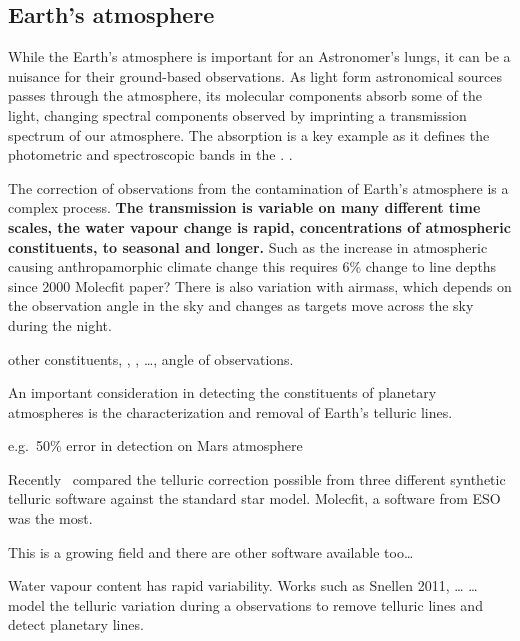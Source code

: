 \subsection{Earth's atmosphere}
While the Earth's atmosphere is important for an Astronomer's lungs, it can be a nuisance for their ground-based observations.
As light form astronomical sources passes through the atmosphere, its molecular components absorb some of the light, changing spectral components observed by imprinting a transmission spectrum of our atmosphere.
The  absorption is a key example as it defines the photometric and spectroscopic bands in the \nir{}. .

The correction of observations from the contamination of Earth's atmosphere is a complex process.\textbf{
The transmission is variable on many different time scales, the water vapour change is rapid, concentrations of atmospheric constituents, to seasonal and longer.}
Such as the increase in atmospheric  causing anthropamorphic climate change this requires 6\% change to  line depths since 2000 Molecfit paper?
There is also variation with airmass, which depends on the observation angle in the sky and changes as targets move across the sky during the night.

other constituents, , ,  \ldots{}, angle of observations.

An important consideration in detecting the constituents of planetary atmospheres is the characterization and removal of Earth's telluric lines.

e.g.\ 50\% error in  detection on Mars atmosphere


Recently~\citet{ulmer-moll_telluric_2018} compared the telluric correction possible from three different synthetic telluric software against the standard star model.
Molecfit, a software from ESO was the most.

This is a growing field and there are other software available too\ldots{}


Water vapour content has rapid variability.
Works such as Snellen 2011, \ldots{} \ldots{} model the telluric variation during a observations to remove telluric lines and detect planetary lines.



